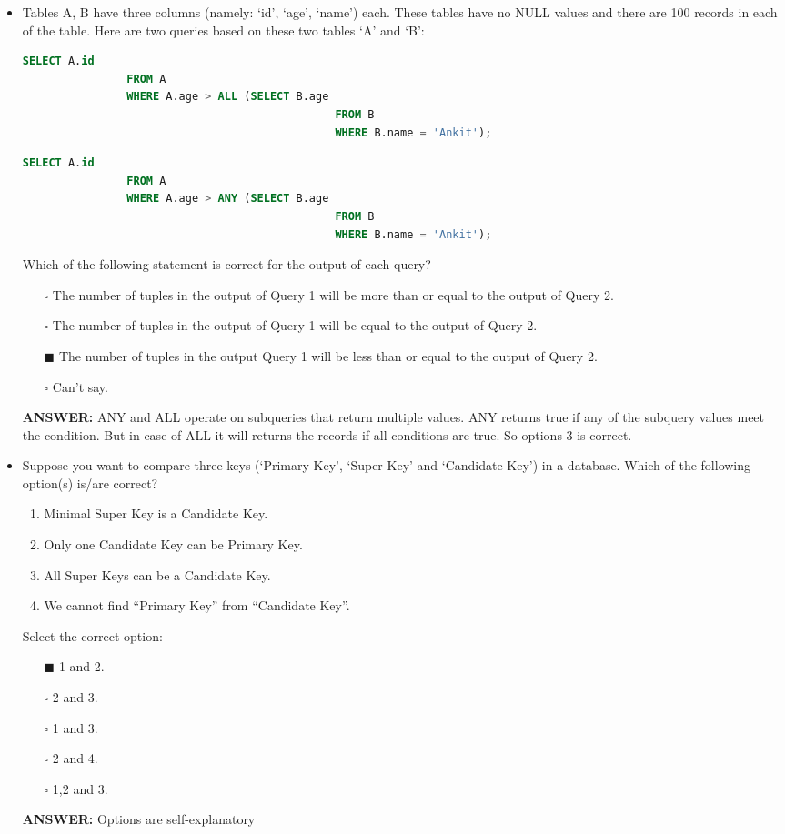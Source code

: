 \documentclass[10pt]{article}
\begin{document}
\begin{itemize}
		\item Tables A, B have three columns (namely: ‘id’, ‘age’, ‘name’) each. These tables have no NULL values and there are 100 records in each of the table. Here are two queries based on these two tables ‘A’ and ‘B’:
			\begin{lstlisting}[language=SQL,firstline=1, lastline=5] 
				SELECT A.id 
				FROM A 
				WHERE A.age > ALL (SELECT B.age 
												FROM B 
												WHERE B.name = 'Ankit');
			\end{lstlisting}
			\begin{lstlisting}[language=SQL,firstline=1, lastline=5] 
				SELECT A.id 
				FROM A 
				WHERE A.age > ANY (SELECT B.age 
												FROM B 
												WHERE B.name = 'Ankit');
			\end{lstlisting}
			Which of the following statement is correct for the output of each query?
			\begin{enumerate}
				\item[$\square$] The number of tuples in the output of Query 1 will be more than or equal to the output of Query 2.
				\item[$\square$] The number of tuples in the output of Query 1 will be equal to the output of Query 2.
				\item[$\blacksquare$] The number of tuples in the output Query 1 will be less than or equal to the output of Query 2.
				\item[$\square$] Can’t say.
			\end{enumerate}
			\color{red} \textbf{ANSWER:} \color{black} ANY and ALL operate on subqueries that return multiple values. ANY returns true if any of the subquery values meet the condition. But in case of ALL it will returns the records if all conditions are true. So options 3 is correct.

		\item Suppose you want to compare three keys (‘Primary Key’, ‘Super Key’ and ‘Candidate Key’) in a database. Which of the following option(s) is/are correct?
			\begin{enumerate}
				\item Minimal Super Key is a Candidate Key.
				\item Only one Candidate Key can be Primary Key.
				\item All Super Keys can be a Candidate Key.
				\item We cannot find “Primary Key” from “Candidate Key”.
			\end{enumerate}
			Select the correct option:
			\begin{enumerate}
				\item[$\blacksquare$] 1 and 2.
				\item[$\square$] 2 and 3.
				\item[$\square$] 1 and 3.
				\item[$\square$] 2 and 4.
				\item[$\square$] 1,2 and 3.
			\end{enumerate}
			\color{red} \textbf{ANSWER:} \color{black} Options are self-explanatory
		

\end{itemize}
\end{document}

